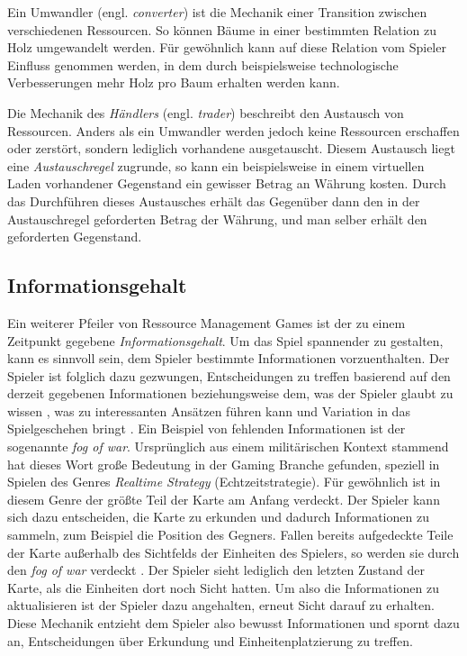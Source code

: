 Ein Umwandler (engl. \textit{converter}) ist die Mechanik einer Transition zwischen verschiedenen Ressourcen. So können Bäume in einer bestimmten Relation zu Holz umgewandelt werden. Für gewöhnlich kann auf diese Relation vom Spieler Einfluss genommen werden, in dem durch beispielsweise technologische Verbesserungen mehr Holz pro Baum erhalten werden kann.

Die Mechanik des \textit{Händlers} (engl. \textit{trader}) beschreibt den Austausch von Ressourcen. Anders als ein Umwandler werden jedoch keine Ressourcen erschaffen oder zerstört, sondern lediglich vorhandene ausgetauscht. Diesem Austausch liegt eine \textit{Austauschregel} zugrunde, so kann ein beispielsweise in einem virtuellen Laden vorhandener Gegenstand ein gewisser Betrag an Währung kosten. Durch das Durchführen dieses Austausches erhält das Gegenüber dann den in der Austauschregel geforderten Betrag der Währung, und man selber erhält den geforderten Gegenstand.

\subsection{Informationsgehalt}
Ein weiterer Pfeiler von Ressource Management Games ist der zu einem Zeitpunkt gegebene \textit{Informationsgehalt}. Um das Spiel spannender zu gestalten, kann es sinnvoll sein, dem Spieler bestimmte Informationen vorzuenthalten. Der Spieler ist folglich dazu gezwungen, Entscheidungen zu treffen basierend auf den derzeit gegebenen Informationen beziehungsweise dem, was der Spieler glaubt zu wissen \cite*[]{paper:information}, was zu interessanten Ansätzen führen kann und Variation in das Spielgeschehen bringt \cite*[]{definition:ressourcemanagementfandom}. Ein Beispiel von fehlenden Informationen ist der sogenannte \textit{fog of war}. Ursprünglich aus einem militärischen Kontext stammend hat dieses Wort große Bedeutung in der Gaming Branche gefunden, speziell in Spielen des Genres \textit{Realtime Strategy} (Echtzeitstrategie). Für gewöhnlich ist in diesem Genre der größte Teil der Karte am Anfang verdeckt. Der Spieler kann sich dazu entscheiden, die Karte zu erkunden und dadurch Informationen zu sammeln, zum Beispiel die Position des Gegners. Fallen bereits aufgedeckte Teile der Karte außerhalb des Sichtfelds der Einheiten des Spielers, so werden sie durch den \textit{fog of war} verdeckt \cite*[]{article:fogofwar}. Der Spieler sieht lediglich den letzten Zustand der Karte, als die Einheiten dort noch Sicht hatten. Um also die Informationen zu aktualisieren ist der Spieler dazu angehalten, erneut Sicht darauf zu erhalten. Diese Mechanik entzieht dem Spieler also bewusst Informationen und spornt dazu an, Entscheidungen über Erkundung und Einheitenplatzierung zu treffen. 

